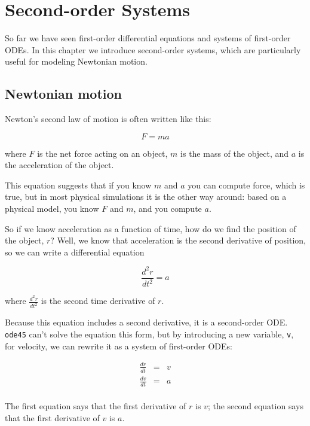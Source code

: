 \documentclass[
]{book}
\numberwithin{Answer}{chapter}
\numberwithin{Exercise}{chapter}
\begin{document}
\chapter{Second-order Systems}

So far we have seen first-order differential equations and systems of first-order ODEs.  In this chapter we introduce second-order systems, which are particularly useful for modeling Newtonian motion.


\section{Newtonian motion}

Newton's second law of motion is often written like this:

\begin{equation}
    F = m a
\end{equation}

where $F$ is the net force acting on an object, $m$ is the
mass of the object, and $a$ is the acceleration of the object.

This equation suggests
that if you know $m$ and $a$ you can compute force, which is true,
but in most physical simulations it is the other way around:  based on a
physical model, you know $F$ and $m$, and you compute $a$.

So if we know acceleration as a function of time, how do we
find the position of the object, $r$?  Well, we know that acceleration
is the second derivative of position, so we can write a differential
equation

\begin{equation}
\label{eq:pos_acc}
    \frac{d^2r}{dt^2} = a
\end{equation}

where $\frac{d^2r}{dt^2}$ is the second time derivative of $r$.

Because this equation includes a second derivative, it is
a second-order ODE.  {\tt ode45} can't solve the equation this form, but
by introducing a new variable, {\tt v}, for velocity, we can rewrite it
as a system of first-order ODEs:

\begin{eqnarray}
    \label{eq:pos_vel}
    \frac{dr}{dt} &=& v   \\
    \label{eq:vel_acc}
    \frac{dv}{dt} &=& a   \\
\end{eqnarray}

The first equation says that the first derivative of $r$ is $v$;
the second equation says that the first derivative of $v$ is $a$.
\end{document}

